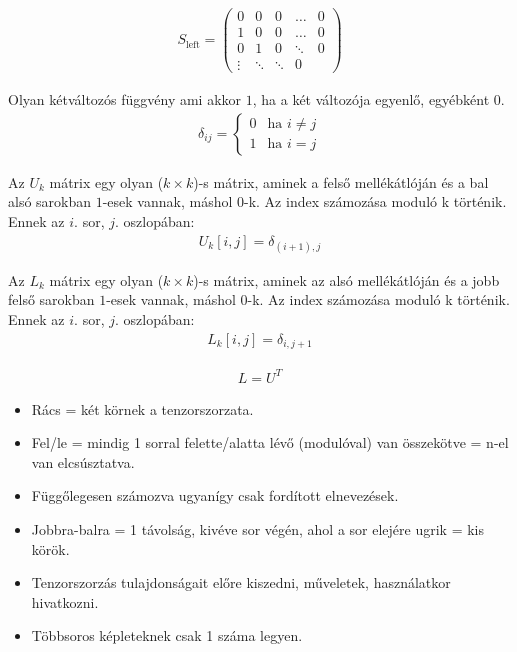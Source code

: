 \begin{align}
  S_{\text{left}} =
  \begin{pmatrix}
    0      & 0      & 0      & \dots  & 0 \\
    1      & 0      & 0      & \dots  & 0 \\
    0      & 1      & 0      & \ddots & 0 \\
    \vdots & \ddots & \ddots & 0
  \end{pmatrix}
\end{align}

\begin{definition}
  Olyan kétváltozós függvény ami akkor $1$, ha a két változója egyenlő, egyébként $0$.
  \begin{align}
    \delta_{ij} =
    \begin{cases}
      0 & \text{ha $i\neq{}j$} \\
      1 & \text{ha $i=j$}
    \end{cases}
  \end{align}
\end{definition}

\begin{definition}
  Az $U_{k}$ mátrix egy olyan ($k\times{}k$)-s mátrix, aminek a felső mellékátlóján és a bal alsó sarokban
  $1$-esek vannak, máshol $0$-k.
  Az index számozása moduló k történik.
  Ennek az $i$. sor, $j$. oszlopában:
  \begin{align}
    U_{k}[i,j] = \delta_{(i+1),j}
  \end{align}
\end{definition}

\begin{definition}
  Az $L_{k}$ mátrix egy olyan ($k\times{}k$)-s mátrix, aminek az alsó mellékátlóján és a jobb felső sarokban
  $1$-esek vannak, máshol $0$-k.
  Az index számozása moduló k történik.
  Ennek az $i$. sor, $j$. oszlopában:
  \begin{align}
    L_{k}[i,j] = \delta_{i,j+1}
  \end{align}
\end{definition}

\begin{align}
  L = U^{T}
\end{align}


\begin{itemize}
  \item Rács = két körnek a tenzorszorzata.
  \item Fel/le = mindig 1 sorral felette/alatta lévő (modulóval) van összekötve = n-el van elcsúsztatva.
  \item Függőlegesen számozva ugyanígy csak fordított elnevezések.
  \item Jobbra-balra = 1 távolság, kivéve sor végén, ahol a sor elejére ugrik = kis körök.
  \item Tenzorszorzás tulajdonságait előre kiszedni, műveletek, használatkor hivatkozni.
  \item Többsoros képleteknek csak 1 száma legyen.
\end{itemize}

